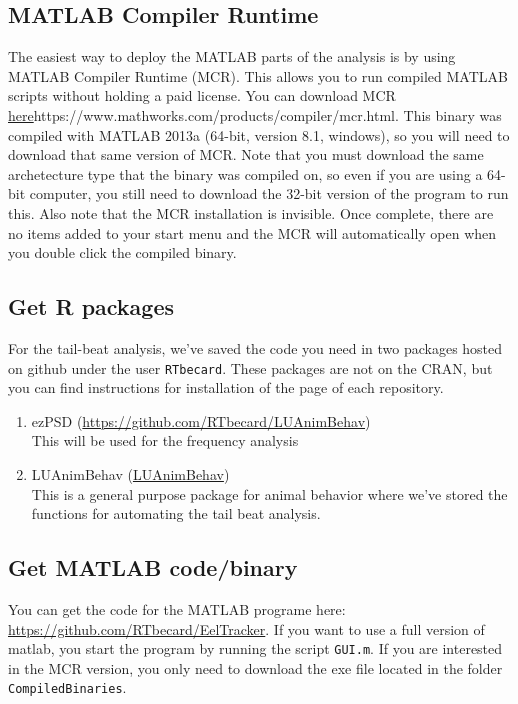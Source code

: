 \documentclass[11pt]{report}
\begin{document}
\subsection{MATLAB Compiler Runtime}

The easiest way to deploy the MATLAB parts of the analysis is by using MATLAB Compiler Runtime (MCR).
This allows you to run compiled MATLAB scripts without holding a paid license. You can download MCR \url{here}{https://www.mathworks.com/products/compiler/mcr.html}.
This binary was compiled with MATLAB 2013a (64-bit, version 8.1, windows), so you will need to download that same version of MCR.
Note that you must download the same archetecture type that the binary was compiled on, so even if you are using a 64-bit computer, you still need to download the 32-bit version of the program to run this.
Also note that the MCR installation is invisible.
Once complete, there are no items added to your start menu and the MCR will automatically open when you double click the compiled binary.

\subsection{Get R packages}
For the tail-beat analysis, we've saved the code you need in two packages hosted on github under the user \texttt{RTbecard}.
These packages are not on the CRAN, but you can find instructions for installation of the page of each repository.

\begin{enumerate}
  \item ezPSD (\url{https://github.com/RTbecard/LUAnimBehav}) \\
  This will be used for the frequency analysis
  \item LUAnimBehav (\url{LUAnimBehav}) \\
  This is a general purpose package for animal behavior where we've stored the functions for automating the tail beat analysis.
\end{enumerate}

\subsection{Get MATLAB code/binary}
You can get the code for the MATLAB programe here: \url{https://github.com/RTbecard/EelTracker}.
If you want to use a full version of matlab, you start the program by running the script \texttt{GUI.m}.
If you are interested in the MCR version, you only need to download the exe file located in the folder \texttt{CompiledBinaries}.
\end{document}
